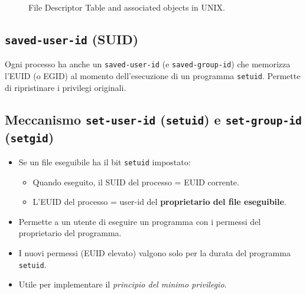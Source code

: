 \begin{figure}[H]
\caption{File Descriptor Table and associated objects in UNIX.}
\label{fig:fd_table_unix}
\end{figure}

\subsection{\texttt{saved-user-id} (SUID)}
Ogni processo ha anche un \texttt{saved-user-id} (e \texttt{saved-group-id}) che memorizza l'EUID (o EGID) al momento dell'esecuzione di un programma \texttt{setuid}. Permette di ripristinare i privilegi originali.

\subsection{Meccanismo \texttt{set-user-id} (\texttt{setuid}) e \texttt{set-group-id} (\texttt{setgid})}
\begin{itemize}
    \item Se un file eseguibile ha il bit \texttt{setuid} impostato:
    \begin{itemize}
        \item Quando eseguito, il SUID del processo = EUID corrente.
        \item L'EUID del processo = user-id del \textbf{proprietario del file eseguibile}.
    \end{itemize}
    \item Permette a un utente di eseguire un programma con i permessi del proprietario del programma.
    \item I nuovi permessi (EUID elevato) valgono solo per la durata del programma \texttt{setuid}.
    \item Utile per implementare il \textit{principio del minimo privilegio}.
\end{itemize}

